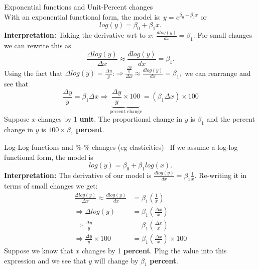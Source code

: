 \documentclass[
  ignorenonframetext,
]{beamer}
\begin{document}
\begin{frame}{Exponential functions and Unit-Percent changes\\
}
\protect\hypertarget{exponential-functions-and-unit-percent-changes}{}
With an exponential functional form, the model is:
\(y=e^{\beta_0+\beta_1x}\) or \[
log(y)=\beta_0+\beta_1x.
\] \textbf{Interpretation:} Taking the derivative wrt to \(x\):
\(\frac{dlog(y)}{dx}=\beta_1.\) For small changes we can rewrite this as
\[
\frac{\Delta log(y)}{\Delta x}\approx \frac{dlog(y)}{dx}=\beta_1.
\] Using the fact that
\(\Delta log(y)=\frac{\Delta y}{y}\):\(\Rightarrow \frac{\frac{\Delta y}{y}}{\Delta x}\approx \frac{dlog(y)}{dx}=\beta_1,\)
we can rearrange and see that \[
\frac{\Delta y}{y}=\beta_1\Delta x \Rightarrow \underbrace{\frac{\Delta y}{y}\times100}_{\text{percent change}}=(\beta_1 \Delta x)\times100
\] Suppose \(x\) changes by 1 \textbf{unit}. The proportional change in
\(y\) is \(\beta_1\) and the percent change in \(y\) is
\(100\times\beta_1\) \textbf{percent}.
\end{frame}

\begin{frame}{Log-Log functions and \%-\% changes (eg elasticities)~}
\protect\hypertarget{log-log-functions-and---changes-eg-elasticities}{}
If we assume a log-log functional form, the model is \[
log(y)=\beta_0+\beta_1log(x).
\] \textbf{Interpretation:} The derivative of our model is
\(\frac{dlog(y)}{dx}=\beta_1\frac{1}{x}\). Re-writing it in terms of
small changes we get: \[
\begin{aligned}
\frac{\Delta log(y)}{\Delta x}\approx \frac{dlog(y)}{dx}&=\beta_1(\frac{1}{x})\\
\Rightarrow \Delta log(y)&=\beta_1 (\frac{\Delta x}{x})\\
\Rightarrow \frac{\Delta y}{y}&=\beta_1  (\frac{\Delta x}{x})\\
\Rightarrow \frac{\Delta y}{y}\times100&=\beta_1  (\frac{\Delta x}{x})\times 100
\end{aligned}
\] Suppose we know that \(x\) changes by 1 \textbf{percent}. Plug the
value into this expression and we see that \(y\) will change by
\(\beta_1\) \textbf{percent}.
\end{frame}
\end{document}
